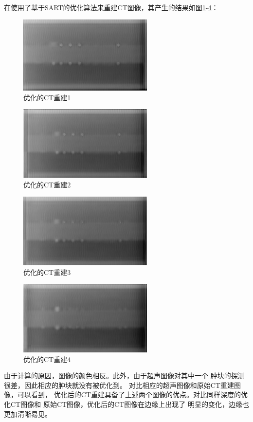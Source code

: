 在使用了基于SART的优化算法来重建CT图像，其产生的结果如图\ref{fig:final1}-\ref{fig:final4}：
\begin{figure}[!ht]
\center
\includegraphics[width=0.6\textwidth]{figure/result/final1.jpg}
\caption{优化的CT重建1}\label{fig:final1}
\end{figure}
\begin{figure}[!ht]
\center
\includegraphics[width=0.6\textwidth]{figure/result/final2.jpg}
\caption{优化的CT重建2}\label{fig:final2}
\end{figure}
\begin{figure}[!ht]
\center
\includegraphics[width=0.6\textwidth]{figure/result/final3.jpg}
\caption{优化的CT重建3}\label{fig:final3}
\end{figure}
\begin{figure}[!ht]
\center
\includegraphics[width=0.6\textwidth]{figure/result/final4.jpg}
\caption{优化的CT重建4}\label{fig:final4}
\end{figure}
由于计算的原因，图像的颜色相反。此外，由于超声图像对其中一个
肿块的探测很差，因此相应的肿块就没有被优化到。
对比相应的超声图像和原始CT重建图像，可以看到，
优化后的CT重建具备了上述两个图像的优点。对比同样深度的优化CT图像和
原始CT图像，优化后的CT图像在边缘上出现了
明显的变化，边缘也更加清晰易见。

